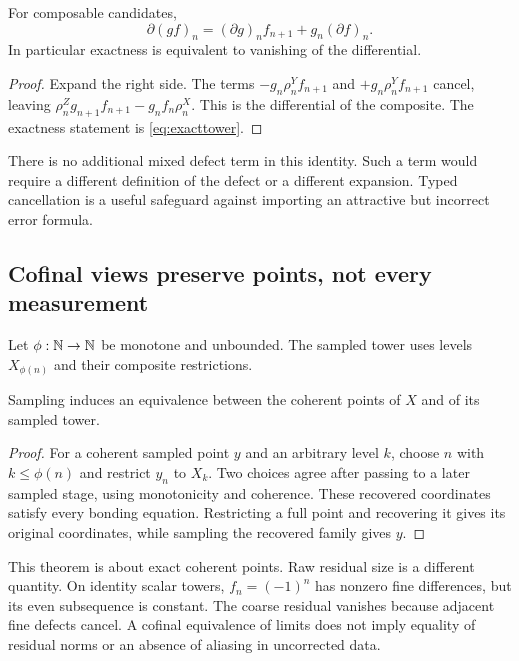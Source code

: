 \begin{proposition}\label{KS17}
For composable candidates,
\[
 \partial(gf)_n=(\partial g)_nf_{n+1}+g_n(\partial f)_n.
\]
In particular exactness is equivalent to vanishing of the differential.
\end{proposition}
\begin{proof}
Expand the right side. The terms \(-g_n\rho^Y_nf_{n+1}\) and \(+g_n\rho^Y_nf_{n+1}\) cancel, leaving \(\rho^Z_ng_{n+1}f_{n+1}-g_nf_n\rho^X_n\). This is the differential of the composite. The exactness statement is \eqref{eq:exacttower}.
\end{proof}
There is no additional mixed defect term in this identity. Such a term would require a different definition of the defect or a different expansion. Typed cancellation is a useful safeguard against importing an attractive but incorrect error formula.

\subsection{Cofinal views preserve points, not every measurement}
Let \(\phi:\mathbb N\to\mathbb N\) be monotone and unbounded. The sampled tower uses levels \(X_{\phi(n)}\) and their composite restrictions.

\begin{theorem}\label{KS18}
Sampling induces an equivalence between the coherent points of \(X\) and of its sampled tower.
\end{theorem}
\begin{proof}
For a coherent sampled point \(y\) and an arbitrary level \(k\), choose \(n\) with \(k\le\phi(n)\) and restrict \(y_n\) to \(X_k\). Two choices agree after passing to a later sampled stage, using monotonicity and coherence. These recovered coordinates satisfy every bonding equation. Restricting a full point and recovering it gives its original coordinates, while sampling the recovered family gives \(y\).
\end{proof}
This theorem is about exact coherent points. Raw residual size is a different quantity. On identity scalar towers, \(f_n=(-1)^n\) has nonzero fine differences, but its even subsequence is constant. The coarse residual vanishes because adjacent fine defects cancel. A cofinal equivalence of limits does not imply equality of residual norms or an absence of aliasing in uncorrected data.


